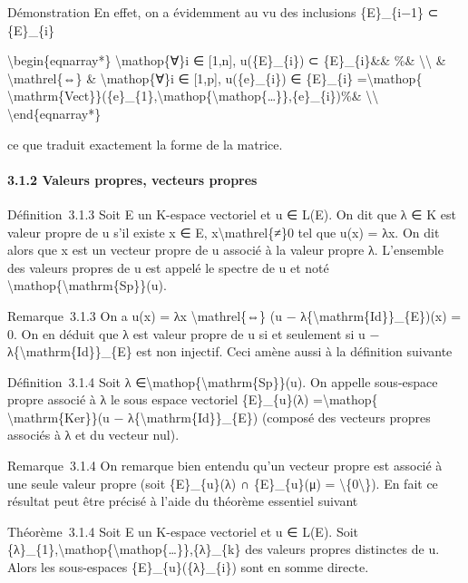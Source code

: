 \documentclass[]{article}
\begin{document}
Démonstration En effet, on a évidemment au vu des inclusions
\{E\}\_\{i−1\} ⊂ \{E\}\_\{i\}

\textbackslash{}begin\{eqnarray*\} \textbackslash{}mathop\{∀\}i ∈
{[}1,n{]}, u(\{E\}\_\{i\}) ⊂ \{E\}\_\{i\}\&\& \%\&
\textbackslash{}\textbackslash{} \& \textbackslash{}mathrel\{⇔\} \&
\textbackslash{}mathop\{∀\}i ∈ {[}1,p{]}, u(\{e\}\_\{i\}) ∈ \{E\}\_\{i\}
=\textbackslash{}mathop\{
\textbackslash{}mathrm\{Vect\}\}(\{e\}\_\{1\},\textbackslash{}mathop\{\textbackslash{}mathop\{\ldots{}\}\},\{e\}\_\{i\})\%\&
\textbackslash{}\textbackslash{} \textbackslash{}end\{eqnarray*\}

ce que traduit exactement la forme de la matrice.

\paragraph{3.1.2 Valeurs propres, vecteurs propres}

Définition~3.1.3 Soit E un K-espace vectoriel et u ∈ L(E). On dit que λ
∈ K est valeur propre de u s'il existe x ∈ E,
x\textbackslash{}mathrel\{≠\}0 tel que u(x) = λx. On dit alors que x est
un vecteur propre de u associé à la valeur propre λ. L'ensemble des
valeurs propres de u est appelé le spectre de u et noté
\textbackslash{}mathop\{\textbackslash{}mathrm\{Sp\}\}(u).

Remarque~3.1.3 On a u(x) = λx \textbackslash{}mathrel\{⇔\} (u −
λ\{\textbackslash{}mathrm\{Id\}\}\_\{E\})(x) = 0. On en déduit que λ est
valeur propre de u si et seulement si u −
λ\{\textbackslash{}mathrm\{Id\}\}\_\{E\} est non injectif. Ceci amène
aussi à la définition suivante

Définition~3.1.4 Soit λ
∈\textbackslash{}mathop\{\textbackslash{}mathrm\{Sp\}\}(u). On appelle
sous-espace propre associé à λ le sous espace vectoriel \{E\}\_\{u\}(λ)
=\textbackslash{}mathop\{ \textbackslash{}mathrm\{Ker\}\}(u −
λ\{\textbackslash{}mathrm\{Id\}\}\_\{E\}) (composé des vecteurs propres
associés à λ et du vecteur nul).

Remarque~3.1.4 On remarque bien entendu qu'un vecteur propre est associé
à une seule valeur propre (soit \{E\}\_\{u\}(λ) ∩ \{E\}\_\{u\}(μ) =
\textbackslash{}\{0\textbackslash{}\}). En fait ce résultat peut être
précisé à l'aide du théorème essentiel suivant

Théorème~3.1.4 Soit E un K-espace vectoriel et u ∈ L(E). Soit
\{λ\}\_\{1\},\textbackslash{}mathop\{\textbackslash{}mathop\{\ldots{}\}\},\{λ\}\_\{k\}
des valeurs propres distinctes de u. Alors les sous-espaces
\{E\}\_\{u\}(\{λ\}\_\{i\}) sont en somme directe.
\end{document}

